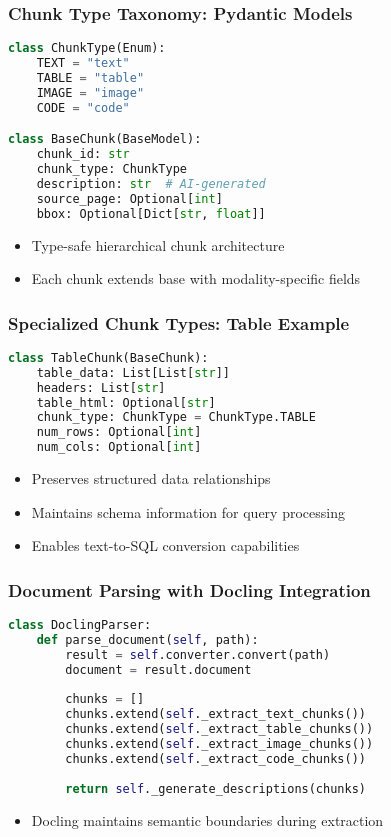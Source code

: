 \begin{frame}[fragile]\frametitle{Chunk Type Taxonomy: Pydantic Models}
\begin{lstlisting}[language=Python]
class ChunkType(Enum):
    TEXT = "text"
    TABLE = "table"
    IMAGE = "image"
    CODE = "code"

class BaseChunk(BaseModel):
    chunk_id: str
    chunk_type: ChunkType
    description: str  # AI-generated
    source_page: Optional[int]
    bbox: Optional[Dict[str, float]]
\end{lstlisting}
\begin{itemize}
\item Type-safe hierarchical chunk architecture
\item Each chunk extends base with modality-specific fields
\end{itemize}
\end{frame}

\begin{frame}[fragile]\frametitle{Specialized Chunk Types: Table Example}
\begin{lstlisting}[language=Python]
class TableChunk(BaseChunk):
    table_data: List[List[str]]
    headers: List[str]
    table_html: Optional[str]
    chunk_type: ChunkType = ChunkType.TABLE
    num_rows: Optional[int]
    num_cols: Optional[int]
\end{lstlisting}
\begin{itemize}
\item Preserves structured data relationships
\item Maintains schema information for query processing
\item Enables text-to-SQL conversion capabilities
\end{itemize}
\end{frame}

\begin{frame}[fragile]\frametitle{Document Parsing with Docling Integration}
\begin{lstlisting}[language=Python]
class DoclingParser:
    def parse_document(self, path):
        result = self.converter.convert(path)
        document = result.document
        
        chunks = []
        chunks.extend(self._extract_text_chunks())
        chunks.extend(self._extract_table_chunks())
        chunks.extend(self._extract_image_chunks())
        chunks.extend(self._extract_code_chunks())
        
        return self._generate_descriptions(chunks)
\end{lstlisting}
\begin{itemize}
\item Docling maintains semantic boundaries during extraction
\end{itemize}
\end{frame}

